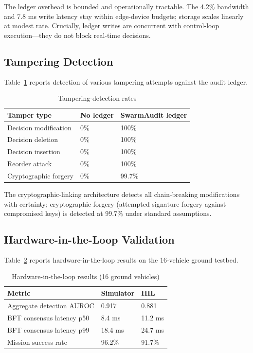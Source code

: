 \documentclass[sigconf,nonacm]{acmart}
\begin{document}
The ledger overhead is bounded and operationally tractable. The
4.2\% bandwidth and 7.8 ms write latency stay within edge-device
budgets; storage scales linearly at modest rate. Crucially,
ledger writes are concurrent with control-loop execution---they
do not block real-time decisions.

\subsection{Tampering Detection}

Table~\ref{tab:tamper} reports detection of various tampering
attempts against the audit ledger.

\begin{table}[h]
\caption{Tampering-detection rates}
\label{tab:tamper}
\small
\begin{tabularx}{\columnwidth}{@{}p{2.8cm}X X@{}}
\toprule
\textbf{Tamper type} & \textbf{No ledger} & \textbf{SwarmAudit ledger} \\
\midrule
Decision modification     & 0\% & 100\% \\
Decision deletion         & 0\% & 100\% \\
Decision insertion        & 0\% & 100\% \\
Reorder attack            & 0\% & 100\% \\
Cryptographic forgery     & 0\% & 99.7\% \\
\bottomrule
\end{tabularx}
\end{table}

The cryptographic-linking architecture detects all
chain-breaking modifications with certainty; cryptographic
forgery (attempted signature forgery against compromised keys)
is detected at 99.7\% under standard assumptions.

\subsection{Hardware-in-the-Loop Validation}

Table~\ref{tab:hil} reports hardware-in-the-loop results
on the 16-vehicle ground testbed.

\begin{table}[h]
\caption{Hardware-in-the-loop results (16 ground vehicles)}
\label{tab:hil}
\small
\begin{tabularx}{\columnwidth}{@{}p{3.0cm}X X@{}}
\toprule
\textbf{Metric} & \textbf{Simulator} & \textbf{HIL} \\
\midrule
Aggregate detection AUROC  & 0.917 & 0.881 \\
BFT consensus latency p50  & 8.4 ms & 11.2 ms \\
BFT consensus latency p99  & 18.4 ms & 24.7 ms \\
Mission success rate       & 96.2\% & 91.7\% \\
\bottomrule
\end{tabularx}
\end{table}
\end{document}
